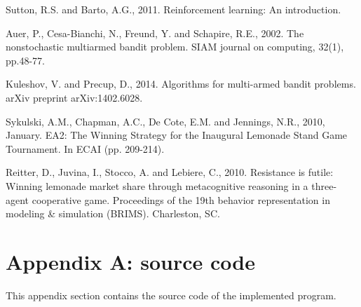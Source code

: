 \documentclass[runningheads]{llncs}
\begin{document}
\begin{thebibliography}{8}

Sutton, R.S. and Barto, A.G., 2011. Reinforcement learning: An
introduction.

Auer, P., Cesa-Bianchi, N., Freund, Y. and Schapire, R.E., 2002. The
nonstochastic multiarmed bandit problem. SIAM journal on computing,
32(1), pp.48-77.

Kuleshov, V. and Precup, D., 2014. Algorithms for multi-armed bandit
problems. arXiv preprint arXiv:1402.6028.

Sykulski, A.M., Chapman, A.C., De Cote, E.M. and Jennings, N.R., 2010,
January. EA2: The Winning Strategy for the Inaugural Lemonade Stand
Game Tournament. In ECAI (pp. 209-214).

Reitter, D., Juvina, I., Stocco, A. and Lebiere, C., 2010. Resistance
is futile: Winning lemonade market share through metacognitive
reasoning in a three-agent cooperative game. Proceedings of the 19th
behavior representation in modeling \& simulation (BRIMS). Charleston,
SC.
  
\end{thebibliography}

\section{Appendix A: source code}\label{appendix}
This appendix section contains the source code of the implemented program.

\end{document}
